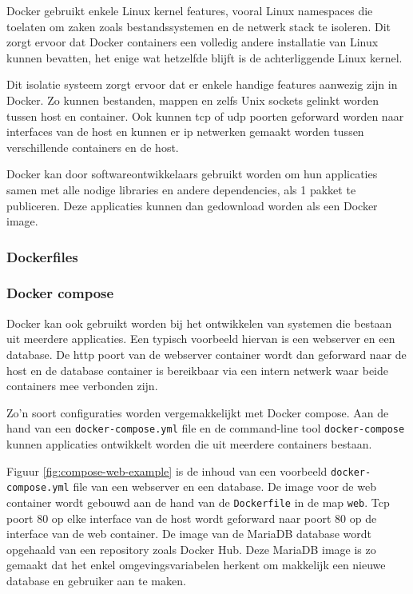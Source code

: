 \documentclass[a4paper,12pt]{report}
\begin{document}
Docker gebruikt enkele Linux kernel features, vooral Linux namespaces die toelaten om zaken zoals bestandssystemen en de netwerk stack te isoleren.
Dit zorgt ervoor dat Docker containers een volledig andere installatie van Linux kunnen bevatten, het enige wat hetzelfde blijft is de achterliggende Linux kernel.

Dit isolatie systeem zorgt ervoor dat er enkele handige features aanwezig zijn in Docker.
Zo kunnen bestanden, mappen en zelfs Unix sockets gelinkt worden tussen host en container.
Ook kunnen tcp of udp poorten geforward worden naar interfaces van de host en kunnen er ip netwerken gemaakt worden tussen verschillende containers en de host.

Docker kan door softwareontwikkelaars gebruikt worden om hun applicaties samen met alle nodige libraries en andere dependencies, als 1 pakket te publiceren.
Deze applicaties kunnen dan gedownload worden als een Docker image.



\subsubsection{Dockerfiles}

\autocite{docker:containers}

\subsubsection{Docker compose}

Docker kan ook gebruikt worden bij het ontwikkelen van systemen die bestaan uit meerdere applicaties.
Een typisch voorbeeld hiervan is een webserver en een database.
De http poort van de webserver container wordt dan geforward naar de host en de database container is bereikbaar via een intern netwerk waar beide containers mee verbonden zijn.

Zo'n soort configuraties worden vergemakkelijkt met Docker compose.
Aan de hand van een \lstinline|docker-compose.yml| file en de command-line tool \lstinline|docker-compose| kunnen applicaties ontwikkelt worden die uit meerdere containers bestaan.
\autocite{docker:compose}

Figuur \ref{fig:compose-web-example} is de inhoud van een voorbeeld \lstinline|docker-compose.yml| file van een webserver en een database.
De image voor de web container wordt gebouwd aan de hand van de \lstinline|Dockerfile| in de map \lstinline|web|.
Tcp poort 80 op elke interface van de host wordt geforward naar poort 80 op de interface van de web container.
De image van de MariaDB database wordt opgehaald van een repository zoals Docker Hub.
Deze MariaDB image is zo gemaakt dat het enkel omgevingsvariabelen herkent om makkelijk een nieuwe database en gebruiker aan te maken.
\end{document}
